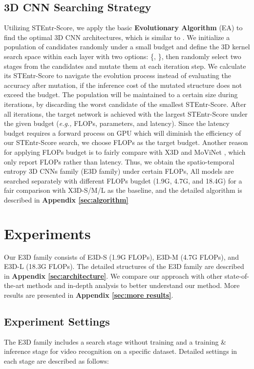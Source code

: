 \documentclass{article} \usepackage{iclr2023_conference,times}
\def\eg{\emph{e.g., }}
\begin{document}
\subsection{3D CNN Searching Strategy}
Utilizing STEntr-Score, we apply the basic \textbf{Evolutionary Algorithm} (EA) to find the optimal 3D CNN architectures, which is similar to \citep{lin2021zen,sun2022mae}.
We initialize a population of candidates randomly under a small budget and define the 3D kernel search space within each layer with two options: \{, \}, then randomly select two stages from the candidates and mutate them at each iteration step.
We calculate its STEntr-Score to navigate the evolution process instead of evaluating the accuracy after mutation, if the inference cost of the mutated structure does not exceed the budget.
The population will be maintained to a certain size during iterations, by discarding the worst candidate of the smallest STEntr-Score.
After all iterations, the target network is achieved with the largest STEntr-Score under the given budget (\eg FLOPs, parameters, and latency).
Since the latency budget requires a forward process on GPU which will diminish the efficiency of our STEntr-Score search, we choose FLOPs as the target budget. Another reason for applying FLOPs budget is to fairly compare with X3D \citep{feichtenhofer2020x3d} and MoViNet \citep{kondratyuk2021movinets}, which only report FLOPs rather than latency.
Thus, we obtain the spatio-temporal entropy 3D CNNs family (E3D family) under certain FLOPs,
All models are searched separately with different FLOPs bugdet (1.9G, 4.7G, and 18.4G) for a fair comparison with X3D-S/M/L as the baseline, and the detailed algorithm is described in \textbf{Appendix \ref{sec:algorithm}}







\section{Experiments}
Our E3D family consists of E3D-S (1.9G FLOPs), E3D-M (4.7G FLOPs), and E3D-L (18.3G FLOPs).
The detailed structures of the E3D family are described in \textbf{Appendix \ref{sec:architecture}}.
We compare our approach with other state-of-the-art methods and in-depth analysis to better understand our method.
More results are presented in \textbf{Appendix \ref{sec:more results}}.


\subsection{Experiment Settings}
The E3D family includes a search stage without training and a training \& inference stage for video recognition on a specific dataset. Detailed settings in each stage are described as follows:
\end{document}

